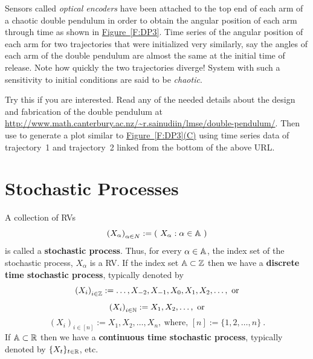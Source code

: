 Sensors called {\em optical encoders} have been attached to the top end of each arm of a chaotic double pendulum in order to obtain the angular position of each arm through time as shown in \hyperref[F:DP3]{Figure~\ref*{F:DP3}}.  Time series of the angular position of each arm for two trajectories that were initialized very similarly, say the angles of each arm of the double pendulum are almost the same at the initial time of release.  Note how quickly the two trajectories diverge!  System with such a sensitivity to initial conditions are said to be {\em chaotic}.

\begin{labwork}\label{LW:DPtrajectoryparsing}  Try this if you are interested.  Read any of the needed details about the design and fabrication of  the double pendulum at \href{http://www.math.canterbury.ac.nz/~r.sainudiin/lmse/double-pendulum/}{\url{http://www.math.canterbury.ac.nz/~r.sainudiin/lmse/double-pendulum/}}.  Then use \Matlab to generate a plot similar to \hyperref[F:DP3]{Figure~\ref*{F:DP3}(C)} using time series data of {\sf trajectory~1} and {\sf  trajectory~2} linked from the bottom of the above URL.
 \end{labwork}



\section{Stochastic Processes}\label{S:StochProc}

\begin{definition}
A collection of RVs  \[
\left(X_{\alpha} \right)_{\alpha \in N} := \left( \  X_{\alpha} : \alpha \in \mathbb{A} \  \right)
\]
is called a {\bf stochastic process}.  Thus, for every $\alpha \in  \mathbb{A}$, the index set of the stochastic process, $X_{\alpha}$ is a RV.  If the index set $ \mathbb{A}  \subset \mathbb{Z}$ then we have  a {\bf discrete time stochastic process}, typically denoted by 
\[
\left(X_i\right)_{i \in \mathbb{Z}} := \ldots, X_{-2},X_{-1},X_0, X_1,X_2,\ldots , \  \text{or}
\]
\[
\left( X_i \right)_{i \in \mathbb{N}} := X_1,X_2,\ldots , \  \text{or}
\]
\[
\left( X_i \right)_{i \in [n]} := X_1,X_2,\ldots , X_n , \ \text{where, } [n]:= \{1,2,\ldots,n\} \ .
\]
If $\mathbb{A} \subset \mathbb{R}$ then we have a {\bf continuous time stochastic process}, typically denoted by $\{X_t\}_{t \in \mathbb{R}}$, etc.  
\end{definition}

